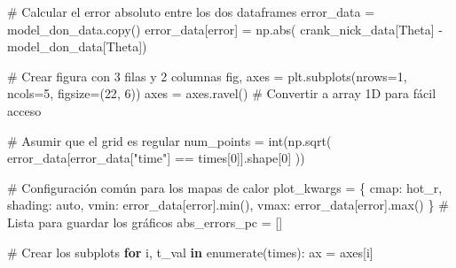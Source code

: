 \documentclass[
  spanish,
  us-letterpaper,
  DIV=11,
  numbers=noendperiod]{scrreprt}
\newenvironment{Shaded}{\begin{snugshade}}{\end{snugshade}}
\newcommand{\BuiltInTok}[1]{\textcolor[rgb]{0.00,0.23,0.31}{#1}}
\newcommand{\CommentTok}[1]{\textcolor[rgb]{0.37,0.37,0.37}{#1}}
\newcommand{\ControlFlowTok}[1]{\textcolor[rgb]{0.00,0.23,0.31}{\textbf{#1}}}
\newcommand{\DecValTok}[1]{\textcolor[rgb]{0.68,0.00,0.00}{#1}}
\newcommand{\KeywordTok}[1]{\textcolor[rgb]{0.00,0.23,0.31}{\textbf{#1}}}
\newcommand{\NormalTok}[1]{\textcolor[rgb]{0.00,0.23,0.31}{#1}}
\newcommand{\OperatorTok}[1]{\textcolor[rgb]{0.37,0.37,0.37}{#1}}
\newcommand{\StringTok}[1]{\textcolor[rgb]{0.13,0.47,0.30}{#1}}
\theoremstyle{plain}
\theoremstyle{definition}
\theoremstyle{remark}
\begin{document}
\begin{Shaded}
\begin{Highlighting}[]
\CommentTok{\# Calcular el error absoluto entre los dos dataframes}
\NormalTok{error\_data }\OperatorTok{=}\NormalTok{ model\_don\_data.copy()}
\NormalTok{error\_data[}\StringTok{\textquotesingle{}error\textquotesingle{}}\NormalTok{] }\OperatorTok{=}\NormalTok{ np.}\BuiltInTok{abs}\NormalTok{(}
\NormalTok{                    crank\_nick\_data[}\StringTok{\textquotesingle{}Theta\textquotesingle{}}\NormalTok{] }\OperatorTok{{-}}\NormalTok{ model\_don\_data[}\StringTok{\textquotesingle{}Theta\textquotesingle{}}\NormalTok{])}

\CommentTok{\# Crear figura con 3 filas y 2 columnas}
\NormalTok{fig, axes }\OperatorTok{=}\NormalTok{ plt.subplots(nrows}\OperatorTok{=}\DecValTok{1}\NormalTok{, ncols}\OperatorTok{=}\DecValTok{5}\NormalTok{, figsize}\OperatorTok{=}\NormalTok{(}\DecValTok{22}\NormalTok{, }\DecValTok{6}\NormalTok{))}
\NormalTok{axes }\OperatorTok{=}\NormalTok{ axes.ravel()  }\CommentTok{\# Convertir a array 1D para fácil acceso}

\CommentTok{\# Asumir que el grid es regular}
\NormalTok{num\_points }\OperatorTok{=} \BuiltInTok{int}\NormalTok{(np.sqrt(}
\NormalTok{                    error\_data[error\_data[}\StringTok{"time"}\NormalTok{] }\OperatorTok{==}\NormalTok{ times[}\DecValTok{0}\NormalTok{]].shape[}\DecValTok{0}\NormalTok{]}
\NormalTok{                    ))}

\CommentTok{\# Configuración común para los mapas de calor}
\NormalTok{plot\_kwargs }\OperatorTok{=}\NormalTok{ \{}
    \StringTok{\textquotesingle{}cmap\textquotesingle{}}\NormalTok{: }\StringTok{\textquotesingle{}hot\_r\textquotesingle{}}\NormalTok{,}
    \StringTok{\textquotesingle{}shading\textquotesingle{}}\NormalTok{: }\StringTok{\textquotesingle{}auto\textquotesingle{}}\NormalTok{,}
    \StringTok{\textquotesingle{}vmin\textquotesingle{}}\NormalTok{: error\_data[}\StringTok{\textquotesingle{}error\textquotesingle{}}\NormalTok{].}\BuiltInTok{min}\NormalTok{(),}
    \StringTok{\textquotesingle{}vmax\textquotesingle{}}\NormalTok{: error\_data[}\StringTok{\textquotesingle{}error\textquotesingle{}}\NormalTok{].}\BuiltInTok{max}\NormalTok{()}
\NormalTok{\}}
\CommentTok{\# Lista para guardar los gráficos}
\NormalTok{abs\_errors\_pc }\OperatorTok{=}\NormalTok{ []}

\CommentTok{\# Crear los subplots}
\ControlFlowTok{for}\NormalTok{ i, t\_val }\KeywordTok{in} \BuiltInTok{enumerate}\NormalTok{(times):}
\NormalTok{    ax }\OperatorTok{=}\NormalTok{ axes[i]}
    

\end{Highlighting}
\end{Shaded}
\end{document}
